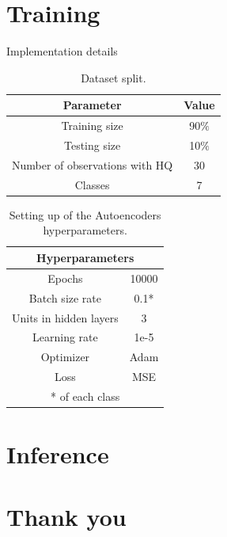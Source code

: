 \documentclass{beamer}
\begin{document}
\section{Training}
\begin{frame}{Implementation details}
    \begin{minipage}{0.6\textwidth}
        \begin{table}
            \scriptsize
            \begin{tabular}{c | c} 
                \hline
                Parameter & Value \\ [1ex] 
                \hline
                Training size & 90$\%$ \\ [1ex]
                Testing size & 10$\%$ \\ [1ex]
                Number of observations with HQ & 30 \\
                Classes & 7 \\ [1ex] 
                \hline
            \end{tabular}
        \caption{Dataset split.}
        \end{table}
    \end{minipage}
    \begin{minipage}{0.35\textwidth}
        \begin{table}
            \scriptsize
            \begin{tabular}{c|c}
            \hline
                \multicolumn{2}{c}{Hyperparameters} \\ \hline
                Epochs & 10000 \\ 
                Batch size rate & 0.1* \\ 
                Units in hidden layers & 3 \\ 
                Learning rate & 1e-5 \\ 
                Optimizer & Adam \\ 
                Loss & MSE \\ \hline
                \multicolumn{2}{c}{* of each class}
            \end{tabular}
            \caption{Setting up of the Autoencoders hyperparameters.}
        \end{table}
    \end{minipage}
\end{frame}


\section{Inference}


\section{Thank you}
\end{document}
